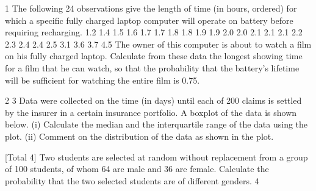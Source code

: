 \documentclass[a4paper,12pt]{article}
\begin{document}
\begin{enumerate}
1
The following 24 observations give the length of time (in hours, ordered) for which a
specific fully charged laptop computer will operate on battery before requiring
recharging.
1.2 1.4 1.5 1.6 1.7 1.7 1.8 1.8 1.9 1.9 2.0 2.0
2.1 2.1 2.1 2.2 2.3 2.4 2.4 2.5 3.1 3.6 3.7 4.5
The owner of this computer is about to watch a film on his fully charged laptop.
Calculate from these data the longest showing time for a film that he can watch, so
that the probability that the battery's lifetime will be sufficient for watching the entire
film is 0.75.

2
3
Data were collected on the time (in days) until each of 200 claims is settled by the
insurer in a certain insurance portfolio. A boxplot of the data is shown below.
(i) Calculate the median and the interquartile range of the data using the plot. 
(ii) Comment on the distribution of the data as shown in the plot.

[Total 4]
Two students are selected at random without replacement from a group of 100
students, of whom 64 are male and 36 are female.
Calculate the probability that the two selected students are of different genders.
4


\end{enumerate}
\end{document}
